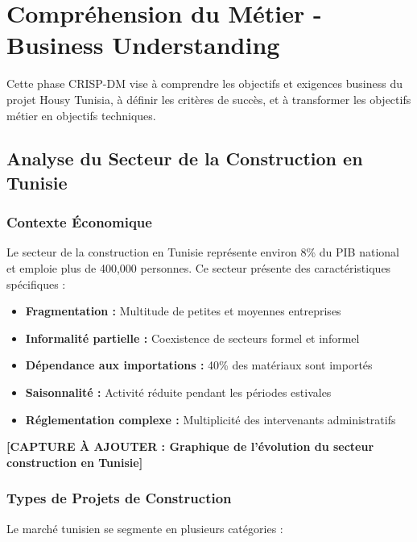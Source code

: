 \chapter{Compréhension du Métier - Business Understanding}

\begin{objectivebox}
Cette phase CRISP-DM vise à comprendre les objectifs et exigences business du projet Housy Tunisia, à définir les critères de succès, et à transformer les objectifs métier en objectifs techniques.
\end{objectivebox}

\section{Analyse du Secteur de la Construction en Tunisie}

\subsection{Contexte Économique}

Le secteur de la construction en Tunisie représente environ 8\% du PIB national et emploie plus de 400,000 personnes. Ce secteur présente des caractéristiques spécifiques :

\begin{itemize}
    \item \textbf{Fragmentation :} Multitude de petites et moyennes entreprises
    \item \textbf{Informalité partielle :} Coexistence de secteurs formel et informel
    \item \textbf{Dépendance aux importations :} 40\% des matériaux sont importés
    \item \textbf{Saisonnalité :} Activité réduite pendant les périodes estivales
    \item \textbf{Réglementation complexe :} Multiplicité des intervenants administratifs
\end{itemize}

\textbf{[CAPTURE À AJOUTER : Graphique de l'évolution du secteur construction en Tunisie]}

\subsection{Types de Projets de Construction}

Le marché tunisien se segmente en plusieurs catégories :

